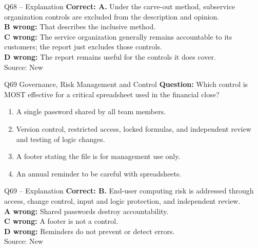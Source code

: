 \documentclass[aspectratio=169,10pt]{beamer}
\begin{document}
\begin{frame}[t]{Q68 -- Explanation}
	\footnotesize
	\textbf{Correct: A.} Under the carve-out method, subservice organization controls are excluded from the description and opinion. \\[5pt]
\textbf{B wrong:} That describes the inclusive method. \\[3pt]
\textbf{C wrong:} The service organization generally remains accountable to its customers; the report just excludes those controls. \\[3pt]
\textbf{D wrong:} The report remains useful for the controls it does cover. \\[3pt]
	\vfill {\tiny Source: New}
\end{frame}

\begin{frame}[t]{Q69 \hfill {\scriptsize Governance, Risk Management and Control}}
	\small
	\textbf{Question:} Which control is MOST effective for a critical spreadsheet used in the financial close?
	\begin{enumerate}[label=\Alph*.,itemsep=1pt,topsep=3pt]
			\item A single password shared by all team members.
			\item Version control, restricted access, locked formulas, and independent review and testing of logic changes.
			\item A footer stating the file is for management use only.
			\item An annual reminder to be careful with spreadsheets.
	\end{enumerate}
\end{frame}

\begin{frame}[t]{Q69 -- Explanation}
	\footnotesize
	\textbf{Correct: B.} End-user computing risk is addressed through access, change control, input and logic protection, and independent review. \\[5pt]
\textbf{A wrong:} Shared passwords destroy accountability. \\[3pt]
\textbf{C wrong:} A footer is not a control. \\[3pt]
\textbf{D wrong:} Reminders do not prevent or detect errors. \\[3pt]
	\vfill {\tiny Source: New}
\end{frame}
\end{document}
